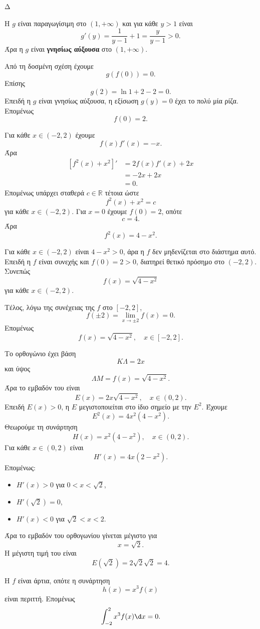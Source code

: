 \begin{thema}{Δ}
\begin{erwthma}
\item Η $g$ είναι παραγωγίσιμη στο $(1,+\infty)$ και για κάθε $y>1$ είναι
\[
g'(y)=\frac{1}{y-1}+1=\frac{y}{y-1}>0.
\]
Άρα η $g$ είναι \textbf{γνησίως αύξουσα} στο $(1,+\infty)$.

Από τη δοσμένη σχέση έχουμε
\[
g(f(0))=0.
\]
Επίσης
\[
g(2)=\ln1+2-2=0.
\]
Επειδή η $g$ είναι γνησίως αύξουσα, η εξίσωση $g(y)=0$ έχει το πολύ μία ρίζα. Επομένως
\[
{f(0)=2}.
\]

\item Για κάθε $x\in(-2,2)$ έχουμε
\[
f(x)f'(x)=-x.
\]
Άρα
\begin{align*}
\left[f^2(x)+x^2\right]'
&=2f(x)f'(x)+2x\\
&=-2x+2x\\
&=0.
\end{align*}
Επομένως υπάρχει σταθερά $c\in\mathbb{R}$ τέτοια ώστε
\[
f^2(x)+x^2=c
\]
για κάθε $x\in(-2,2)$. Για $x=0$ έχουμε $f(0)=2$, οπότε
\[
c=4.
\]
Άρα
\[
f^2(x)=4-x^2.
\]

Για κάθε $x\in(-2,2)$ είναι $4-x^2>0$, άρα η $f$ δεν μηδενίζεται στο διάστημα αυτό. Επειδή η $f$ είναι συνεχής και $f(0)=2>0$, διατηρεί θετικό πρόσημο στο $(-2,2)$. Συνεπώς
\[
f(x)=\sqrt{4-x^2}
\]
για κάθε $x\in(-2,2)$.

Τέλος, λόγω της συνέχειας της $f$ στο $[-2,2]$,
\[
f(\pm2)=\lim_{x\to\pm2}f(x)=0.
\]
Επομένως
\[
{f(x)=\sqrt{4-x^2}},\quad x\in[-2,2].
\]

\item Το ορθογώνιο έχει βάση
\[
K\Lambda=2x
\]
και ύψος
\[
\Lambda M=f(x)=\sqrt{4-x^2}.
\]
Άρα το εμβαδόν του είναι
\[
E(x)=2x\sqrt{4-x^2},\quad x\in(0,2).
\]
Επειδή $E(x)>0$, η $E$ μεγιστοποιείται στο ίδιο σημείο με την $E^2$. Έχουμε
\[
E^2(x)=4x^2(4-x^2).
\]
Θεωρούμε τη συνάρτηση
\[
H(x)=x^2(4-x^2),\quad x\in(0,2).
\]
Για κάθε $x\in(0,2)$ είναι
\[
H'(x)=4x(2-x^2).
\]
Επομένως:
\begin{itemize}
\item $H'(x)>0$ για $0<x<\sqrt2$,
\item $H'(\sqrt2)=0$,
\item $H'(x)<0$ για $\sqrt2<x<2$.
\end{itemize}
Άρα το εμβαδόν του ορθογωνίου γίνεται μέγιστο για
\[
{x=\sqrt2}.
\]
Η μέγιστη τιμή του είναι
\[
E(\sqrt2)=2\sqrt2\sqrt2={4}.
\]

\item Η $f$ είναι άρτια, οπότε η συνάρτηση
\[
h(x)=x^3f(x)
\]
είναι περιττή. Επομένως
\[
{\int_{-2}^{2}x^3f(x)\d x=0}.
\]


\end{erwthma}
\end{thema}
